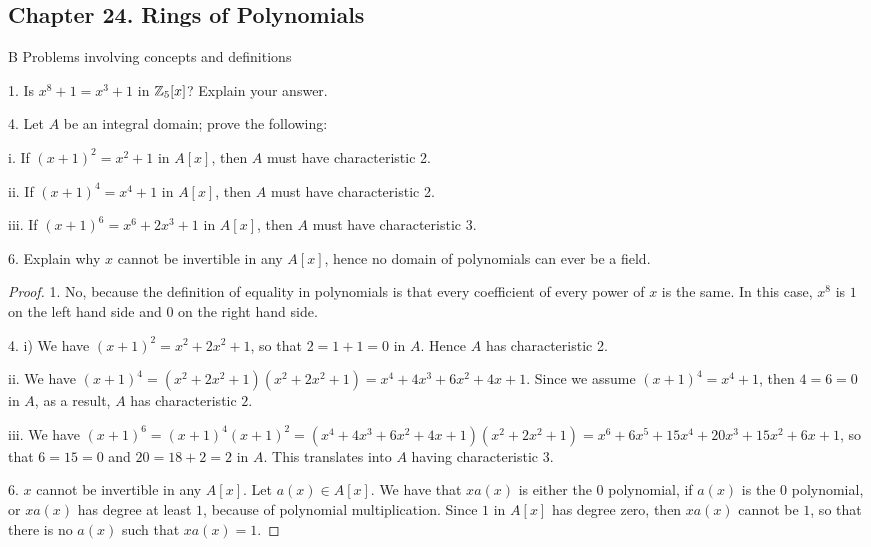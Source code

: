\subsection*{Chapter 24. Rings of Polynomials}


\begin{exercise}{B Problems involving concepts and definitions}

1. Is $x^8 + 1 = x^3 + 1$ in $\mathbb{Z}_{5}[x]$? Explain your answer.

4. Let $A$ be an integral domain; prove the following:
 
i. If $(x+1)^2 = x^2 +1$ in $A[x]$, then $A$ must have characteristic 2.

ii. If $(x+1)^4 = x^4 +1$ in $A[x]$, then $A$ must have characteristic 2.

iii. If $(x+1)^6 = x^6 + 2x^3 +1$ in $A[x]$, then $A$ must have characteristic 3.

6. Explain why $x$ cannot be invertible in any $A[x]$, hence no domain of polynomials can ever be a field.
\end{exercise}
\begin{proof}
 1. No, because the definition of equality in polynomials is that every coefficient of every power of $x$ is the same. In this case, $x^8$ is $1$ on the left hand side and $0$ on the right hand side.
 
 4. i) We have $(x+1)^2 = x^2 + 2x^2 + 1$, so that $2=1+1=0$ in $A$. Hence $A$ has characteristic 2.
 
 ii. We have $(x+1)^4 = (x^2 + 2x^2 + 1)(x^2 + 2x^2 + 1)= x^4 + 4x^3 + 6x^2 + 4x + 1$. Since we assume $(x+1)^4 = x^4 +1$, then $4=6=0$ in $A$, as a result, $A$ has characteristic $2$.
 
 iii. We have $(x+1)^6 =(x+1)^4 (x+1)^2 = (x^4 + 4x^3 + 6x^2 + 4x + 1)(x^2 + 2x^2 + 1) = x^6 + 6x^5 + 15x^4 + 20x^3 + 15x^2 + 6x + 1$, so that $6=15=0$ and $20=18+2=2$ in $A$. This translates into $A$ having characteristic $3$.
 
 6. $x$ cannot be invertible in any $A[x]$. Let $a(x)\in A[x]$. We have that $xa(x)$ is either the $0$ polynomial, if $a(x)$ is the $0$ polynomial, or $xa(x)$ has degree at least $1$, because of polynomial multiplication. Since $1$ in $A[x]$ has degree zero, then $xa(x)$ cannot be $1$, so that there is no $a(x)$ such that $xa(x)=1$.
\end{proof}

